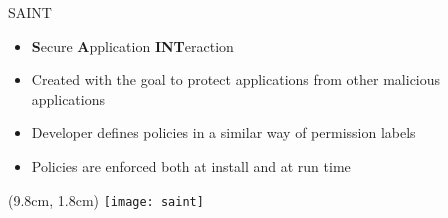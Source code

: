 \begin{frame}{SAINT}

\fontsize{15pt}{0}\selectfont

\begin{itemize}
\item \textbf{S}ecure \textbf{A}pplication \textbf{INT}eraction

\vfill

\item Created with the goal to protect applications from other malicious
applications

\vfill

\item Developer defines policies in a similar way of permission labels

\vfill

\item Policies are enforced both at install and at run time
\end{itemize}

\begin{textblock*}{1cm}(9.8cm, 1.8cm)
    \texttt{[image: saint]}
\end{textblock*}

\end{frame}